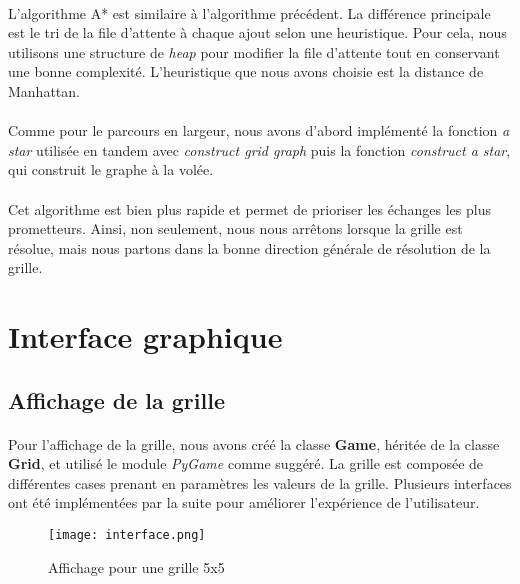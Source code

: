 \documentclass[12pt]{article}
\begin{document}
\paragraph{}
L'algorithme A* est similaire à l'algorithme précédent. La différence principale est le tri de la file d'attente à chaque ajout selon une heuristique. Pour cela, nous utilisons une structure de \textit{heap} pour modifier la file d'attente tout en conservant une bonne complexité. L'heuristique que nous avons choisie est la distance de Manhattan.

\paragraph{}
Comme pour le parcours en largeur, nous avons d'abord implémenté la fonction \textit{a star} utilisée en tandem avec \textit{construct grid graph} puis la fonction \textit{construct a star}, qui construit le graphe à la volée. 

\paragraph{}
Cet algorithme est bien plus rapide et permet de prioriser les échanges les plus prometteurs. Ainsi, non seulement, nous nous arrêtons lorsque la grille est résolue, mais nous partons dans la bonne direction générale de résolution de la grille.

\section{Interface graphique}
\subsection{Affichage de la grille}
\paragraph{}
Pour l'affichage de la grille, nous avons créé la classe \textbf{Game}, héritée de la classe \textbf{Grid}, et utilisé le module \textit{PyGame} comme suggéré. La grille est composée de différentes cases prenant en paramètres les valeurs de la grille. Plusieurs interfaces ont été implémentées par la suite pour améliorer l'expérience de l'utilisateur.

\begin{figure}
    \centering
    \texttt{[image: interface.png]} 
    \caption{Affichage pour une grille 5x5}
    \label{fig:enter-label}
\end{figure}
\end{document}
